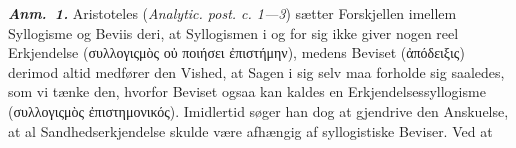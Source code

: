 \documentclass[12pt]{book}
\newcommand{\anm}[1]{\emph{\textbf{Anm.~#1.}}}
\begin{document}
\anm{1} Aristoteles (\textit{Analytic. post. c. 1---3}) sætter Forskjellen imellem
Syllogisme og Beviis deri, at Syllogismen i og for sig ikke giver nogen reel
Erkjendelse (συλλογιςμὸς οὐ ποιήσει ἐπιστήμην), medens Beviset (ἀπόδειξις)
derimod altid medfører den Vished, at Sagen i sig selv maa forholde sig saaledes,
som vi tænke den, hvorfor Beviset ogsaa kan kaldes en Erkjendelsessyllogisme
(συλλογιςμὸς ἐπιστημονικός). Imidlertid søger han dog at gjendrive den Anskuelse,
at al Sandhedserkjendelse skulde være afhængig af syllogistiske Beviser. Ved at
\end{document}
